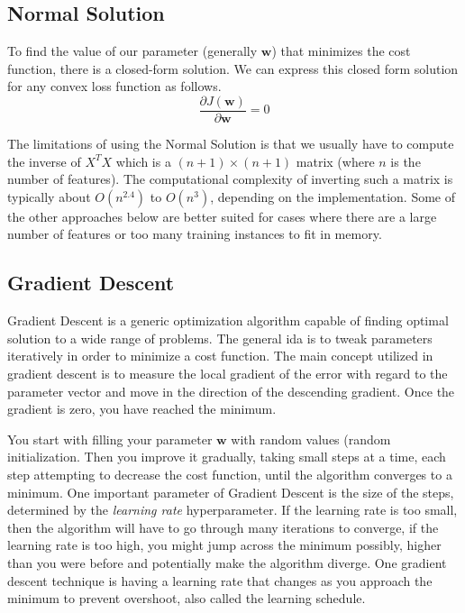 \documentclass[12pt]{article}
\begin{document}
    \subsection{Normal Solution}
        To find the value of our parameter (generally $\boldsymbol{w}$) that minimizes the cost function, there is a closed-form solution. We can express this closed form solution for any convex loss function as follows.
        $$ \frac{\partial J(\boldsymbol{w})}{\partial \boldsymbol{w}} = 0 $$
        
        The limitations of using the Normal Solution is that we usually have to compute the inverse of $X^TX$ which is a $(n+1) \times (n+1)$ matrix (where $n$ is the number of features). The computational complexity of inverting 
        such a matrix is typically about $O(n^{2.4})$ to $O(n^{3})$, depending on the implementation. Some of the other approaches below are better suited for cases where there are a large number of features or too many training instances
        to fit in memory.

    \subsection{Gradient Descent}
        Gradient Descent is a generic optimization algorithm capable of finding optimal solution to a wide range of problems. The general ida is to tweak parameters iteratively in order to minimize a cost function. The main concept utilized in
        gradient descent is to measure the local gradient of the error with regard to the parameter vector and move in the direction of the descending gradient. Once the gradient is zero, you have reached the minimum.

        You start with filling your parameter $\boldsymbol{w}$ with random values (random initialization. Then you improve it gradually, taking small steps at a time, each step attempting to decrease the cost function, until the algorithm converges
        to a minimum. One important parameter of Gradient Descent is the size of the steps, determined by the \textit{learning rate} hyperparameter. If the learning rate is too small, then the algorithm will have to go through many iterations to converge,
        if the learning rate is too high, you might jump across the minimum possibly, higher than you were before and potentially make the algorithm diverge. One gradient descent technique is having a learning rate that changes as you approach 
        the minimum to prevent overshoot, also called the learning schedule.
\end{document}
